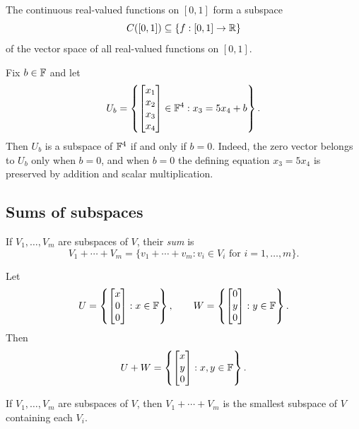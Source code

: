\begin{example}
  The continuous real-valued functions on $[0,1]$ form a subspace
  \[
    C([0,1])\subseteq\{f:[0,1]\to\mathbb{R}\}
  \]
  of the vector space of all real-valued functions on $[0,1]$.
\end{example}

\begin{example}
  Fix $b\in\mathbb{F}$ and let
  \[
    U_b=\left\{
      \begin{bmatrix}x_1\\x_2\\x_3\\x_4\end{bmatrix}\in\mathbb{F}^4:
      x_3=5x_4+b
    \right\}.
  \]
  Then $U_b$ is a subspace of $\mathbb{F}^4$ if and only if $b=0$. Indeed,
  the zero vector belongs to $U_b$ only when $b=0$, and when $b=0$ the
  defining equation $x_3=5x_4$ is preserved by addition and scalar
  multiplication.
\end{example}

\subsection{Sums of subspaces}

\begin{definition}
  If $V_1,\ldots,V_m$ are subspaces of $V$, their \emph{sum} is
  \[
    V_1+\cdots+V_m
    =\{v_1+\cdots+v_m:v_i\in V_i\text{ for }i=1,\ldots,m\}.
  \]
\end{definition}

\begin{example}
  Let
  \[
    U=\left\{\begin{bmatrix}x\\0\\0\end{bmatrix}:x\in\mathbb{F}\right\},
    \qquad
    W=\left\{\begin{bmatrix}0\\y\\0\end{bmatrix}:y\in\mathbb{F}\right\}.
  \]
  Then
  \[
    U+W
    =\left\{\begin{bmatrix}x\\y\\0\end{bmatrix}:x,y\in\mathbb{F}\right\}.
  \]
\end{example}

\begin{proposition}
  If $V_1,\ldots,V_m$ are subspaces of $V$, then
  $V_1+\cdots+V_m$ is the smallest subspace of $V$ containing each
  $V_i$.
\end{proposition}

